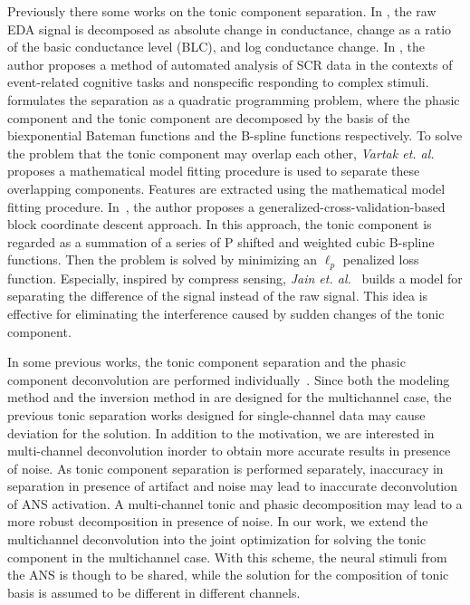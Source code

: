 \documentclass[10pt,conference]{ieeeconf}
\begin{document}
Previously there some works on the tonic component separation. In \cite{van1967skin}, the raw EDA signal is decomposed as absolute change in conductance, change as a ratio of the basic conductance level (BLC), and log conductance change. In \cite{green2014development}, the author proposes a method of automated analysis of SCR data in the contexts of event-related cognitive tasks and nonspecific responding to complex stimuli. \cite{greco2014electrodermal} formulates the separation as a quadratic programming problem, where the phasic component and the tonic component are decomposed by the basis of the biexponential Bateman functions and the B-spline functions respectively. To solve the problem that the tonic component may overlap each other, \textit{Vartak et. al.}~\cite{vartak2009estimation} proposes a mathematical model fitting procedure is used to separate these overlapping components. Features are extracted using the mathematical model fitting procedure. In~\cite{amin2019tonic}, the author proposes a generalized-cross-validation-based block coordinate descent approach. In this approach, the tonic component is regarded as a summation of a series of P shifted and weighted cubic B-spline functions. Then the problem is solved by minimizing an $\ell_p$ penalized loss function. Especially, inspired by compress sensing, \textit{Jain et. al.}~\cite{jain2016compressed} builds a model for separating the difference of the signal instead of the raw signal. This idea is effective for eliminating the interference caused by sudden changes of the tonic component.

In some previous works, the tonic component separation and the phasic component deconvolution are performed individually~\cite{greco2014electrodermal,amin2019robust}. Since both the modeling method and the inversion method in \cite{amin2019robust} are designed for the multichannel case, the previous tonic separation works designed for single-channel data may cause deviation for the solution. In addition to the motivation, we are interested in multi-channel deconvolution inorder to obtain more accurate results in presence of noise. As tonic component separation is performed separately, inaccuracy in separation in presence of artifact and noise may lead to inaccurate deconvolution of ANS activation. A multi-channel tonic and phasic decomposition may lead to a more robust decomposition in presence of noise. In our work, we extend the multichannel deconvolution into the joint optimization for solving the tonic component in the multichannel case. With this scheme, the neural stimuli from the ANS is though to be shared, while the solution for the composition of tonic basis is assumed to be different in different channels.
\end{document}

